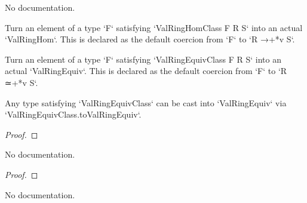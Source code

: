 \begin{definition}\label{ValRingEquivClass}
        \leanok
                No documentation.
    \end{definition}

\begin{definition}\label{ValRingHomClass.toValRingHom}
        \leanok
                Turn an element of a type `F` satisfying `ValRingHomClass F R S` into an actual
`ValRingHom`. This is declared as the default coercion from `F` to `R →+*v S`.
    \end{definition}

\begin{definition}\label{ValRingEquivClass.toValRingEquiv}
        \leanok
                Turn an element of a type `F` satisfying `ValRingEquivClass F R S` into an actual
`ValRingEquiv`. This is declared as the default coercion from `F` to `R ≃+*v S`.
    \end{definition}

\begin{theorem}\label{ValAlgebra.val_map_le_iff}
        \leanok
                Any type satisfying `ValRingEquivClass` can be cast into `ValRingEquiv` via
`ValRingEquivClass.toValRingEquiv`.
    \end{theorem}

\begin{proof}
    \leanok
\end{proof}

\begin{theorem}\label{ValAlgebra.val_map_lt_iff}
        \leanok
                No documentation.
    \end{theorem}

\begin{proof}
    \leanok
\end{proof}

\begin{theorem}\label{ValAlgebra.val_map_le_one_iff}
        \leanok
                No documentation.
    \end{theorem}

